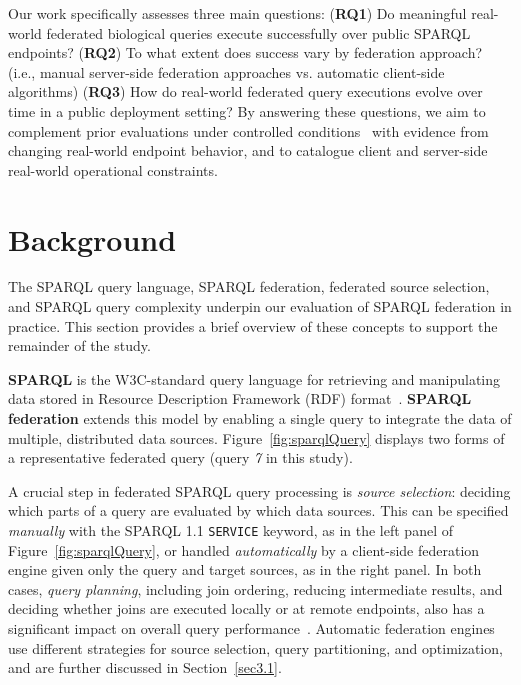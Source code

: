 \documentclass[runningheads]{llncs}
\begin{document}
Our work specifically assesses three main questions:
(\textbf{RQ1}) Do meaningful real-world federated biological queries execute successfully over public SPARQL endpoints?
(\textbf{RQ2}) To what extent does success vary by federation approach? (i.e., manual server-side federation approaches vs. automatic client-side algorithms)
(\textbf{RQ3}) How do real-world federated query executions evolve over time in a public deployment setting?
By answering these questions, we aim to complement prior evaluations under controlled conditions~\cite{Schmidt2011FedBench,Saleem2018LargeRDFBench,Dang2023FedShop} with evidence from changing real-world endpoint behavior, and to catalogue client and server-side real-world operational constraints.


\section{Background}\label{sec2}

The SPARQL query language, SPARQL federation, federated source selection, and SPARQL query complexity underpin our evaluation of SPARQL federation in practice. 
This section provides a brief overview of these concepts to support the remainder of the study.



\textbf{SPARQL} is the W3C-standard query language for retrieving and manipulating data stored in Resource Description Framework (RDF) format~\cite{Feigenbaum2013SPARQL}. 
\textbf{SPARQL federation} extends this model by enabling a single query to integrate the data of multiple, distributed data sources.
Figure~\ref{fig:sparqlQuery} displays two forms of a representative federated query (query \textit{7} in this study).

A crucial step in federated SPARQL query processing is \textit{source selection}: deciding which parts of a query are evaluated by which data sources. 
This can be specified \textit{manually} with the SPARQL 1.1 \texttt{SERVICE} keyword, as in the left panel of Figure~\ref{fig:sparqlQuery}, or handled \textit{automatically} by a client-side federation engine given only the query and target sources, as in the right panel. 
In both cases, \textit{query planning}, including join ordering, reducing intermediate results, and deciding whether joins are executed locally or at remote endpoints, also has a significant impact on overall query performance~\cite{Schmidt2010Foundations}. 
Automatic federation engines use different strategies for source selection, query partitioning, and optimization, and are further discussed in Section~\ref{sec3.1}.
\end{document}
